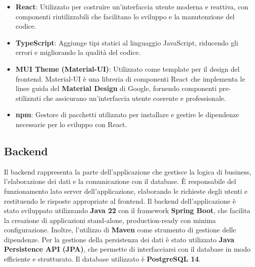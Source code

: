 \begin{itemize}

    \item \textbf{React}: Utilizzato per costruire un'interfaccia utente moderna e reattiva, 
    con componenti riutilizzabili che facilitano lo sviluppo e la manutenzione del codice.

    \item \textbf{TypeScript}: Aggiunge tipi statici al linguaggio JavaScript, riducendo gli errori 
    e migliorando la qualità del codice.

    \item \textbf{MUI Theme (Material-UI)}: Utilizzato come template per il design del frontend. 
    Material-UI è una libreria di componenti React che implementa le linee guida del \textbf{Material 
    Design} di Google, fornendo componenti pre-stilizzati che assicurano un'interfaccia utente 
    coerente e professionale.
    
    \item \textbf{npm}: Gestore di pacchetti utilizzato per installare e gestire le dipendenze necessarie 
    per lo sviluppo con React. 

\end{itemize}

\subsection*{Backend} 
Il backend rappresenta la parte dell'applicazione che gestisce la logica di business, 
l'elaborazione dei dati e la comunicazione con il database. 
È responsabile del funzionamento lato server dell'applicazione, 
elaborando le richieste degli utenti e restituendo le risposte appropriate al frontend.
Il backend dell'applicazione è stato sviluppato utilizzando \textbf{Java 22} con il framework 
\textbf{Spring Boot}, che facilita la creazione di applicazioni stand-alone, 
production-ready con minima configurazione. Inoltre, l'utilizzo di \textbf{Maven}
come strumento di gestione delle dipendenze. Per la gestione della persistenza 
dei dati è stato utilizzato \textbf{Java Persistence API (JPA)}, che permette di interfacciarsi 
con il database in modo efficiente e strutturato. Il database utilizzato è \textbf{PostgreSQL 14}.

